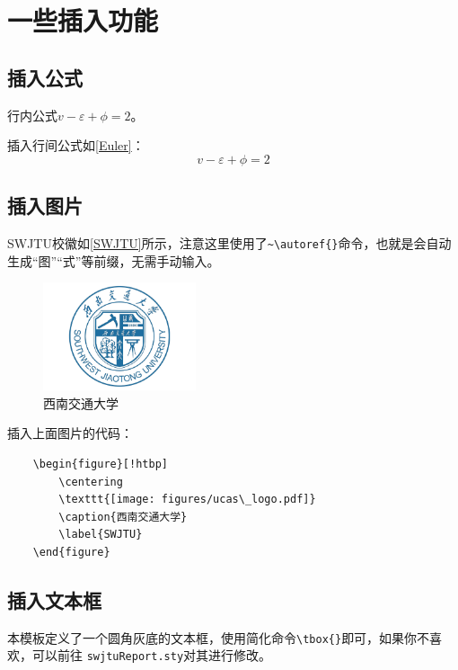 \section{一些插入功能}
\subsection{插入公式}
行内公式$v-\varepsilon+\phi=2$。

插入行间公式如\autoref{Euler}：
\begin{equation}
    v-\varepsilon+\phi=2
    \label{Euler}
\end{equation}

\subsection{插入图片}
SWJTU校徽如\autoref{SWJTU}所示，注意这里使用了\verb|~\autoref{}|命令，也就是会自动生成“图”“式”等前缀，无需手动输入。

\begin{figure}[!htbp]
    \centering
    \includegraphics[width =0.4\textwidth]{figures/swjtu_logo2.pdf}
    \caption{西南交通大学}
    \label{SWJTU}
\end{figure}

插入上面图片的代码：

\begin{verbatim}
    \begin{figure}[!htbp]
        \centering
        \texttt{[image: figures/ucas\_logo.pdf]}
        \caption{西南交通大学}
        \label{SWJTU}
    \end{figure}
\end{verbatim}

\subsection{插入文本框}
本模板定义了一个圆角灰底的文本框，使用简化命令\verb|\tbox{}|即可，如果你不喜欢，可以前往 \texttt{swjtuReport.sty}对其进行修改。


